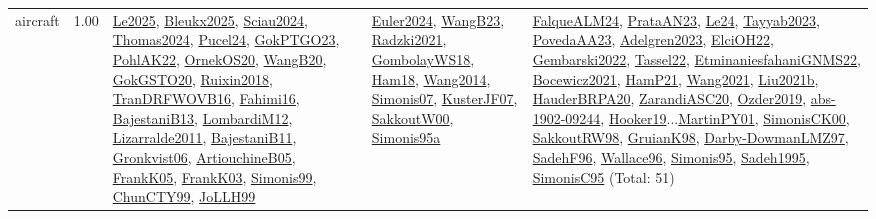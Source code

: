 {\begin{longtable}{p{3cm}r>{\raggedright\arraybackslash}p{6cm}>{\raggedright\arraybackslash}p{6cm}>{\raggedright\arraybackslash}p{8cm}}
\index{aircraft}\index{ApplicationAreas!aircraft}aircraft &  1.00 & \hyperref[detail:Le2025]{Le2025}, \hyperref[detail:Bleukx2025]{Bleukx2025}, \hyperref[detail:Sciau2024]{Sciau2024}, \hyperref[detail:Thomas2024]{Thomas2024}, \hyperref[detail:Pucel24]{Pucel24}, \hyperref[detail:GokPTGO23]{GokPTGO23}, \hyperref[detail:PohlAK22]{PohlAK22}, \hyperref[detail:OrnekOS20]{OrnekOS20}, \hyperref[detail:WangB20]{WangB20}, \hyperref[detail:GokGSTO20]{GokGSTO20}, \hyperref[detail:Ruixin2018]{Ruixin2018}, \hyperref[detail:TranDRFWOVB16]{TranDRFWOVB16}, \hyperref[detail:Fahimi16]{Fahimi16}, \hyperref[detail:BajestaniB13]{BajestaniB13}, \hyperref[detail:LombardiM12]{LombardiM12}, \hyperref[detail:Lizarralde2011]{Lizarralde2011}, \hyperref[detail:BajestaniB11]{BajestaniB11}, \hyperref[detail:Gronkvist06]{Gronkvist06}, \hyperref[detail:ArtiouchineB05]{ArtiouchineB05}, \hyperref[detail:FrankK05]{FrankK05}, \hyperref[detail:FrankK03]{FrankK03}, \hyperref[detail:Simonis99]{Simonis99}, \hyperref[detail:ChunCTY99]{ChunCTY99}, \hyperref[detail:JoLLH99]{JoLLH99} & \hyperref[detail:Euler2024]{Euler2024}, \hyperref[detail:WangB23]{WangB23}, \hyperref[detail:Radzki2021]{Radzki2021}, \hyperref[detail:GombolayWS18]{GombolayWS18}, \hyperref[detail:Ham18]{Ham18}, \hyperref[detail:Wang2014]{Wang2014}, \hyperref[detail:Simonis07]{Simonis07}, \hyperref[detail:KusterJF07]{KusterJF07}, \hyperref[detail:SakkoutW00]{SakkoutW00}, \hyperref[detail:Simonis95a]{Simonis95a} & \hyperref[detail:FalqueALM24]{FalqueALM24}, \hyperref[detail:PrataAN23]{PrataAN23}, \hyperref[detail:Le24]{Le24}, \hyperref[detail:Tayyab2023]{Tayyab2023}, \hyperref[detail:PovedaAA23]{PovedaAA23}, \hyperref[detail:Adelgren2023]{Adelgren2023}, \hyperref[detail:ElciOH22]{ElciOH22}, \hyperref[detail:Gembarski2022]{Gembarski2022}, \hyperref[detail:Tassel22]{Tassel22}, \hyperref[detail:EtminaniesfahaniGNMS22]{EtminaniesfahaniGNMS22}, \hyperref[detail:Bocewicz2021]{Bocewicz2021}, \hyperref[detail:HamP21]{HamP21}, \hyperref[detail:Wang2021]{Wang2021}, \hyperref[detail:Liu2021b]{Liu2021b}, \hyperref[detail:HauderBRPA20]{HauderBRPA20}, \hyperref[detail:ZarandiASC20]{ZarandiASC20}, \hyperref[detail:Ozder2019]{Ozder2019}, \hyperref[detail:abs-1902-09244]{abs-1902-09244}, \hyperref[detail:Hooker19]{Hooker19}...\hyperref[detail:MartinPY01]{MartinPY01}, \hyperref[detail:SimonisCK00]{SimonisCK00}, \hyperref[detail:SakkoutRW98]{SakkoutRW98}, \hyperref[detail:GruianK98]{GruianK98}, \hyperref[detail:Darby-DowmanLMZ97]{Darby-DowmanLMZ97}, \hyperref[detail:SadehF96]{SadehF96}, \hyperref[detail:Wallace96]{Wallace96}, \hyperref[detail:Simonis95]{Simonis95}, \hyperref[detail:Sadeh1995]{Sadeh1995}, \hyperref[detail:SimonisC95]{SimonisC95} (Total: 51)\\

\end{longtable}}
